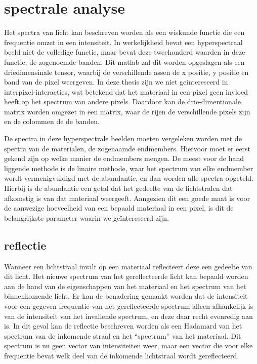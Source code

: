 \documentclass[12pt]{report}
\begin{document}
\section{spectrale analyse}


Het spectra van licht kan beschreven worden als een wiskunde functie die een frequentie omzet in een intensiteit. In werkelijkheid bevat een hyperspectraal beeld niet de volledige functie, maar bevat deze tweehonderd waarden in deze functie, de zogenoemde banden. Dit matlab\citep{MATLAB} zal dit worden opgeslagen als een driedimensinale tensor, waarbij de verschillende assen de x positie, y positie en band van de pixel weergeven. In deze thesis zijn we niet geintereseerd in  interpixel-interacties, wat betekend dat het materiaal in een pixel geen invloed heeft op het spectrum van andere pixels. Daardoor kan de drie-dimentionale matrix worden omgezet in een matrix, waar de rijen de verschillende pixels zijn en de colommen de de banden.  

De spectra in deze hyperspectrale beelden moeten vergeleken worden met de spectra van de materialen, de zogenaamde endmembers. Hiervoor moet er eerst gekend zijn op welke manier de endmembers mengen. De meest voor de hand liggende methode is de linaire methode, waar het spectrum van elke endmember wordt vermenigvuldigd met de abundantie, en dan worden alle spectra opgeteld. Hierbij is de abundantie een getal dat het gedeelte van de lichtstralen dat afkomstig is van dat materiaal weergeeft. Aangezien dit een goede maat is voor de aanwezige hoeveelheid van een bepaald materiaal in een pixel, is dit de belangrijkste parameter waarin we ge\"intereseerd zijn.


\subsection{reflectie}

Wanneer een lichtstraal invalt op een materiaal reflecteert deze een gedeelte van dit licht. Het nieuwe spectrum van het gereflecteerde licht kan bepaald worden aan de hand van de eigenschappen van het materiaal en het spectrum van het binnenkomende licht. Er kan de benadering gemaakt worden dat de intensiteit voor een gegeven frequentie van het gereflecteerde spectrum alleen afhankelijk is van de intensiteit van het invallende spectrum, en deze daar recht evenredig aan is. In dit geval kan de reflectie beschreven worden als een Hadamard van het spectrum van de inkomende straal en het ``spectrum'' van het materiaal. Dit spectrum is nu geen vector van intensiteiten weer, maar een vector die voor elke frequentie bevat welk deel van de inkomende lichtstraal wordt gereflecteerd. 
\end{document}
